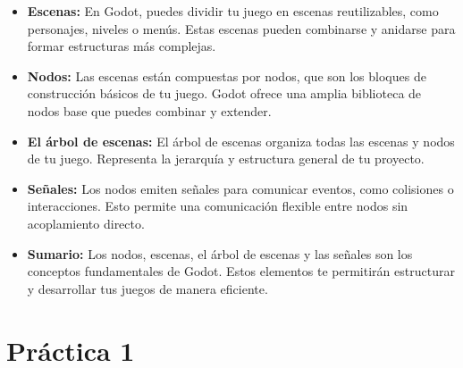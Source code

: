 \documentclass[12pt]{report} %
\begin{document}
\begin{itemize}
    \item \textbf{Escenas:} En Godot, puedes dividir tu juego en escenas reutilizables, como personajes, niveles o menús. Estas escenas pueden combinarse y anidarse para formar estructuras más complejas.

    \item \textbf{Nodos:} Las escenas están compuestas por nodos, que son los bloques de construcción básicos de tu juego. Godot ofrece una amplia biblioteca de nodos base que puedes combinar y extender.

    \item \textbf{El árbol de escenas:} El árbol de escenas organiza todas las escenas y nodos de tu juego. Representa la jerarquía y estructura general de tu proyecto.

    \item \textbf{Señales:} Los nodos emiten señales para comunicar eventos, como colisiones o interacciones. Esto permite una comunicación flexible entre nodos sin acoplamiento directo.

    \item \textbf{Sumario:} Los nodos, escenas, el árbol de escenas y las señales son los conceptos fundamentales de Godot. Estos elementos te permitirán estructurar y desarrollar tus juegos de manera eficiente.
\end{itemize}

\hypertarget{pruxe1ctica-1}{%
\chapter{Práctica 1}\label{pruxe1ctica-1}}




\end{document}
